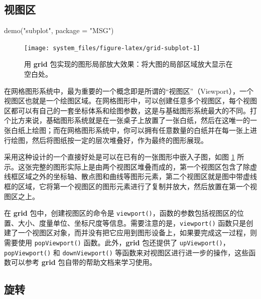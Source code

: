 \documentclass[
  b5paper,
  UTF8,twoside]{book}
\newenvironment{Shaded}{\begin{snugshade}}{\end{snugshade}}
\newcommand{\AttributeTok}[1]{\textcolor[rgb]{0.77,0.63,0.00}{#1}}
\newcommand{\FunctionTok}[1]{\textcolor[rgb]{0.00,0.00,0.00}{#1}}
\newcommand{\NormalTok}[1]{#1}
\newcommand{\StringTok}[1]{\textcolor[rgb]{0.31,0.60,0.02}{#1}}
\begin{document}
\hypertarget{ux89c6ux56feux533a}{%
\subsection{视图区}\label{ux89c6ux56feux533a}}

\begin{Shaded}
\begin{Highlighting}[]
\FunctionTok{demo}\NormalTok{(}\StringTok{"subplot"}\NormalTok{, }\AttributeTok{package =} \StringTok{"MSG"}\NormalTok{)}
\end{Highlighting}
\end{Shaded}

\begin{figure}

{\centering \texttt{[image: system\_files/figure-latex/grid-subplot-1]} 

}

\caption[用 \textbf{grid} 包实现的图形局部放大效果]{用 \textbf{grid} 包实现的图形局部放大效果：将大图的局部区域放大显示在空白处。}\label{fig:grid-subplot}
\end{figure}





在网格图形系统中，最为重要的一个概念即是所谓的``视图区''（Viewport），一个视图区也就是一个绘图区域。在网格图形中，可以创建任意多个视图区，每个视图区都可以有自己的一套坐标体系和绘图参数，这是与基础图形系统最大的不同。打个比方来说，基础图形系统就是在一张桌子上放置了一张白纸，然后在这唯一的一张白纸上绘图；而在网格图形系统中，你可以拥有任意数量的白纸并在每一张上进行绘图，然后将图纸按一定的层次堆叠好，作为最终的图形展现。

采用这种设计的一个直接好处是可以在已有的一张图形中嵌入子图，如图 \ref{fig:grid-subplot} 所示。这张完整的图形实际上是由两个视图区堆叠而成的，第一个视图区包含了除虚线框区域之外的坐标轴、散点图和曲线等图形元素，第二个视图区就是图中带虚线框的区域，它将第一个视图区的图形元素进行了复制并放大，然后放置在第一个视图区之上。

在 \textbf{grid} 包中，创建视图区的命令是 \texttt{viewport()}，函数的参数包括视图区的位置、大小、度量单位、坐标尺度等信息。需要注意的是，\texttt{viewport()} 函数只是创建了一个视图区对象，而并没有把它应用到图形设备上，如果要完成这一过程，则需要使用 \texttt{popViewport()} 函数。此外，\textbf{grid} 包还提供了 \texttt{upViewport()}，\texttt{popViewport()} 和 \texttt{downViewport()} 等函数来对视图区进行进一步的操作，这些函数可以参考 \textbf{grid} 包自带的帮助文档来学习使用。

\hypertarget{ux65cbux8f6c}{%
\subsection{旋转}\label{ux65cbux8f6c}}
\end{document}
